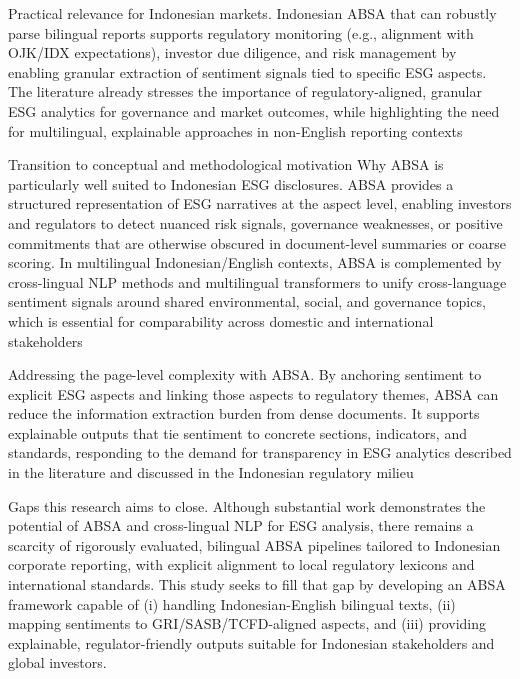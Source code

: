 Practical relevance for Indonesian markets. Indonesian ABSA that can robustly parse bilingual reports supports regulatory monitoring (e.g., alignment with OJK/IDX expectations), investor due diligence, and risk management by enabling granular extraction of sentiment signals tied to specific ESG aspects. The literature already stresses the importance of regulatory-aligned, granular ESG analytics for governance and market outcomes, while highlighting the need for multilingual, explainable approaches in non-English reporting contexts \cite{10.22617/tcs210472-2,10.1108/mf-01-2023-0020,10.1007/s40804-021-00233-z,10.1002/csr.70089,10.69593/ajbais.v4i04.130,10.1111/eufm.12509,10.1109/access.2023.3348342}

Transition to conceptual and methodological motivation
Why ABSA is particularly well suited to Indonesian ESG disclosures. ABSA provides a structured representation of ESG narratives at the aspect level, enabling investors and regulators to detect nuanced risk signals, governance weaknesses, or positive commitments that are otherwise obscured in document-level summaries or coarse scoring. In multilingual Indonesian/English contexts, ABSA is complemented by cross-lingual NLP methods and multilingual transformers to unify cross-language sentiment signals around shared environmental, social, and governance topics, which is essential for comparability across domestic and international stakeholders \cite{10.1002/csr.70089,10.1016/j.inffus.2025.103073,10.1111/eufm.12509,10.48550/arxiv.2511.00024,10.3390/math12193119}

Addressing the page-level complexity with ABSA. By anchoring sentiment to explicit ESG aspects and linking those aspects to regulatory themes, ABSA can reduce the information extraction burden from dense documents. It supports explainable outputs that tie sentiment to concrete sections, indicators, and standards, responding to the demand for transparency in ESG analytics described in the literature and discussed in the Indonesian regulatory milieu \cite{10.1002/csr.70089,10.2139/ssrn.3738629,10.1108/mf-01-2023-0020,10.1108/medar-11-2020-1097}

Gaps this research aims to close. Although substantial work demonstrates the potential of ABSA and cross-lingual NLP for ESG analysis, there remains a scarcity of rigorously evaluated, bilingual ABSA pipelines tailored to Indonesian corporate reporting, with explicit alignment to local regulatory lexicons and international standards. This study seeks to fill that gap by developing an ABSA framework capable of (i) handling Indonesian-English bilingual texts, (ii) mapping sentiments to GRI/SASB/TCFD-aligned aspects, and (iii) providing explainable, regulator-friendly outputs suitable for Indonesian stakeholders and global investors.

